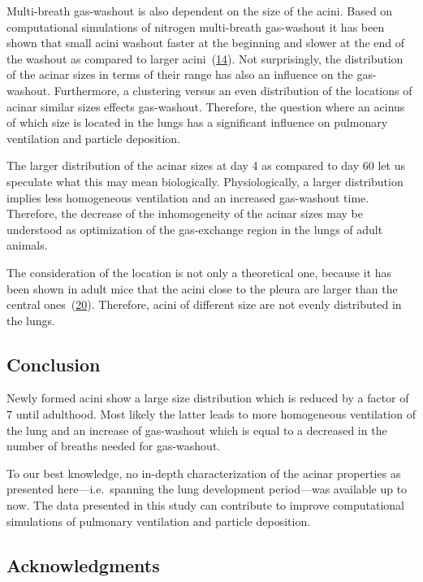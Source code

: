 \documentclass[
  american,
]{article}
\begin{document}
Multi-breath gas-washout is also dependent on the size of the acini.
Based on computational simulations of nitrogen multi-breath gas-washout it has been shown that small acini washout faster at the beginning and slower at the end of the washout as compared to larger acini~(\protect\hyperlink{ref-eb0gk6VO}{14}).
Not surprisingly, the distribution of the acinar sizes in terms of their range has also an influence on the gas-washout.
Furthermore, a clustering versus an even distribution of the locations of acinar similar sizes effects gas-washout.
Therefore, the question where an acinus of which size is located in the lungs has a significant influence on pulmonary ventilation and particle deposition.

The larger distribution of the acinar sizes at day 4 as compared to day 60 let us speculate what this may mean biologically.
Physiologically, a larger distribution implies less homogeneous ventilation and an increased gas-washout time.
Therefore, the decrease of the inhomogeneity of the acinar sizes may be understood as optimization of the gas-exchange region in the lungs of adult animals.

The consideration of the location is not only a theoretical one, because it has been shown in adult mice that the acini close to the pleura are larger than the central ones~(\protect\hyperlink{ref-RGBeCf8v}{20}).
Therefore, acini of different size are not evenly distributed in the lungs.

\hypertarget{conclusion}{%
\subsection{Conclusion}\label{conclusion}}

Newly formed acini show a large size distribution which is reduced by a factor of 7 until adulthood.
Most likely the latter leads to more homogeneous ventilation of the lung and an increase of gas-washout which is equal to a decreased in the number of breaths needed for gas-washout.

To our best knowledge, no in-depth characterization of the acinar properties as presented here---i.e.~spanning the lung development period---was available up to now.
The data presented in this study can contribute to improve computational simulations of pulmonary ventilation and particle deposition.

\hypertarget{acknowledgments}{%
\subsection{Acknowledgments}\label{acknowledgments}}
\end{document}
